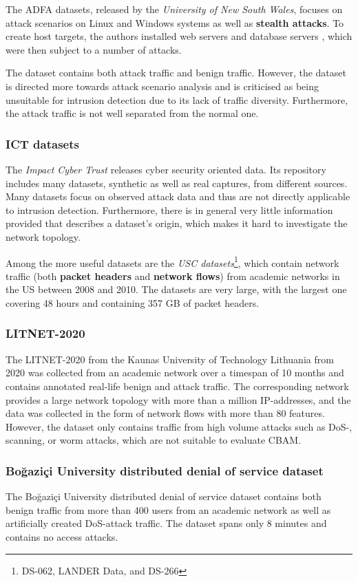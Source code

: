 The ADFA datasets, released by the \textit{University of New South Wales}, focuses on attack scenarios on Linux and Windows systems as well as \textbf{stealth attacks}. To create host targets, the authors  installed web servers and database servers , which were then subject to a number of attacks. 

The dataset contains both attack traffic and benign traffic. However, the dataset is directed more towards attack scenario analysis and is criticised as being unsuitable for intrusion detection due to its lack of traffic diversity. Furthermore, the attack traffic is not well separated from the normal one.

\subsubsection*{ICT datasets \cite{USC2010ICT}}

The \textit{Impact Cyber Trust} releases cyber security oriented data. Its repository includes many datasets, synthetic as well as real captures, from different sources. Many datasets focus on observed attack data and thus are not directly applicable to intrusion detection. Furthermore, there is in general very little information provided that describes a dataset's origin, which makes it hard to investigate the network topology.

Among the more useful datasets are the \textit{USC datasets}\footnote{DS-062, LANDER Data, and DS-266}, which contain network traffic (both \textbf{packet headers} and \textbf{network flows}) from academic networks in the US between 2008 and 2010. The datasets are very large, with the largest one covering 48 hours and containing 357 GB of packet headers. 

\subsubsection{LITNET-2020 \cite{damasevicius2020litnet}}

The LITNET-2020 from the Kaunas University of Technology Lithuania from 2020 was collected from an academic network over a timespan of 10 months and contains annotated real-life benign and attack traffic. The corresponding network provides a large network topology with more than a million IP-addresses, and the data was collected in the form of network flows with more than 80 features. However, the dataset only contains traffic from high volume attacks such as DoS-, scanning, or worm attacks, which are not suitable to evaluate CBAM.

\subsubsection{Bo{\u{g}}azi{\c{c}}i University distributed denial of service dataset} \cite{erhan2020bougazicci}

The Bo{\u{g}}azi{\c{c}}i University distributed denial of service dataset contains both benign traffic from more than 400 users from an academic network as well as artificially created DoS-attack traffic. The dataset spans only 8 minutes and contains no access attacks.



